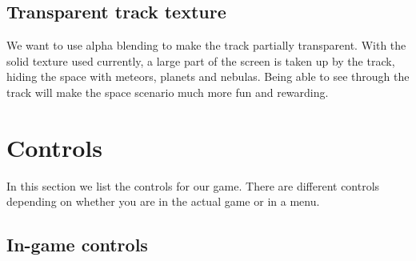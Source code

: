 \documentclass[11pt]{article}
\begin{document}
\subsection{Transparent track texture}

We want to use alpha blending to make the track partially transparent. With the solid texture used currently, a large part of the screen is taken up by the track, hiding the space with meteors, planets and nebulas. Being able to see through the track will make the space scenario much more fun and rewarding.

\appendix

\section{Controls}
\label{controls}

In this section we list the controls for our game. There are different controls
depending on whether you are in the actual game or in a menu. 

\subsection{In-game controls}
\end{document}
